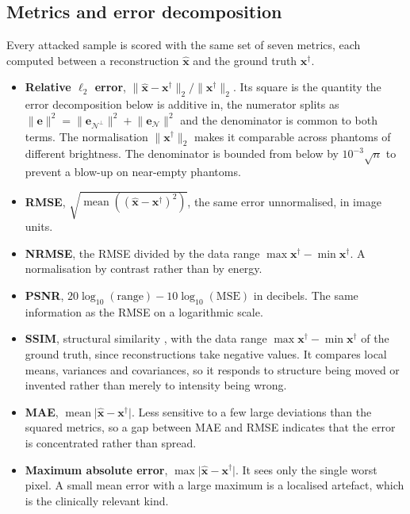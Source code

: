\documentclass{article}
\numberwithin{equation}{section}
\begin{document}
\subsection{Metrics and error decomposition}\label{sec:metrics}
Every attacked sample is scored with the same set of seven metrics, each
computed between a reconstruction $\hat{\mathbf{x}}$ and the ground truth
$\mathbf{x}^\dagger$.
\begin{itemize}
\item \textbf{Relative $\ell_2$ error},
$\lVert\hat{\mathbf{x}}-\mathbf{x}^\dagger\rVert_2/
\lVert\mathbf{x}^\dagger\rVert_2$. Its
square is the quantity the error decomposition below is additive in,
the numerator splits as
$\lVert\mathbf{e}\rVert^2=\lVert\mathbf{e}_{\mathcal{N}^\perp}\rVert^2+
\lVert\mathbf{e}_\mathcal{N}\rVert^2$ and the denominator is common to both
terms. The normalisation
$\lVert\mathbf{x}^\dagger\rVert_2$ makes it comparable across phantoms of
different brightness.
The denominator is bounded from below by $10^{-3}\sqrt{n}$ to prevent a blow-up on near-empty phantoms.
\item \textbf{RMSE}, $\sqrt{\operatorname{mean}({(\hat{\mathbf{x}}-\mathbf{x}^\dagger)}^2)}$,
the same error unnormalised, in image units.
\item \textbf{NRMSE}, the RMSE divided by the data range
$\max\mathbf{x}^\dagger-\min\mathbf{x}^\dagger$. A normalisation by
contrast rather than by energy.
\item \textbf{PSNR}, $20\log_{10}(\text{range})-10\log_{10}(\text{MSE})$ in
decibels. The same information as the RMSE on a logarithmic scale.
\item \textbf{SSIM}, structural similarity \parencite{SSIM}, with the data range
$\max\mathbf{x}^\dagger-\min\mathbf{x}^\dagger$ of the ground truth, since reconstructions take negative
values. It compares local means, variances
and covariances, so it responds to structure being moved or invented rather than
merely to intensity being wrong.
\item \textbf{MAE}, $\operatorname{mean}\lvert\hat{\mathbf{x}}-\mathbf{x}^\dagger\rvert$.
Less sensitive to a few large deviations than the squared metrics, so a gap
between MAE and RMSE indicates that the error is concentrated rather than spread.
\item \textbf{Maximum absolute error},
$\max\lvert\hat{\mathbf{x}}-\mathbf{x}^\dagger\rvert$. It
sees only the single worst pixel. A small mean error with a large maximum is a
localised artefact, which is the clinically relevant kind.
\end{itemize}
\end{document}
